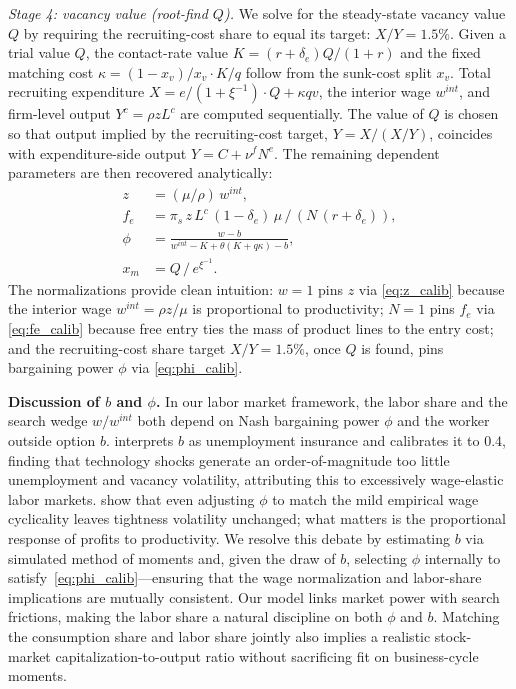 \documentclass[authoryear, review, 12pt]{elsarticle}
\begin{document}
	\medskip\noindent\textit{Stage 4: vacancy value (root-find $Q$).}
	We solve for the steady-state vacancy value $Q$ by requiring the recruiting-cost
	share to equal its target: $X/Y = 1.5\%$. Given a trial value $Q$, the
	contact-rate value $K=(r+\delta_e)Q/(1+r)$ and the fixed matching cost
	$\kappa=(1-x_v)/x_v \cdot K/q$ follow from the sunk-cost split $x_v$. Total
	recruiting expenditure $X=e/(1+\xi^{-1})\cdot Q+\kappa qv$, the interior
	wage $w^{int}$, and firm-level output $Y^c=\rho z L^c$ are computed
	sequentially. The value of $Q$ is chosen so that output implied by the
	recruiting-cost target, $Y=X/(X/Y)$, coincides with expenditure-side
	output $Y=C+\nu^f N^e$.
	The remaining dependent parameters are then recovered analytically:
	\begin{align}
		z      &= (\mu/\rho)\,w^{int}, \label{eq:z_calib}\\
		f_e    &= \pi_s\, z\, L^c\,(1-\delta_e)\,\mu\,/\,(N\,(r+\delta_e)), \label{eq:fe_calib}\\
		\phi   &= \frac{w-b}{w^{int}-K+\theta(K+q\kappa)-b}, \label{eq:phi_calib}\\
		x_m    &= Q\,/\,e^{\xi^{-1}}. \label{eq:xm_calib}
	\end{align}
	The normalizations provide clean intuition: $w=1$ pins $z$ via
	\eqref{eq:z_calib} because the interior wage $w^{int}=\rho z/\mu$ is
	proportional to productivity; $N=1$ pins $f_e$ via \eqref{eq:fe_calib}
	because free entry ties the mass of product lines to the entry cost; and the
	recruiting-cost share target $X/Y=1.5\%$, once $Q$ is found, pins bargaining
	power $\phi$ via \eqref{eq:phi_calib}.
	
	\medskip\noindent\textbf{Discussion of $b$ and $\phi$.}
	In our labor market framework, the labor share and the search wedge $w/w^{int}$
	both depend on Nash bargaining power $\phi$ and the worker outside option $b$.
	\citet{shimer_2005} interprets $b$ as unemployment insurance and calibrates it
	to $0.4$, finding that technology shocks generate an order-of-magnitude too
	little unemployment and vacancy volatility, attributing this to excessively
	wage-elastic labor markets. \citet{hagedorn_2008} show that even adjusting $\phi$
	to match the mild empirical wage cyclicality leaves tightness volatility
	unchanged; what matters is the proportional response of profits to productivity.
	We resolve this debate by estimating $b$ via simulated method of moments and, given the draw
	of $b$, selecting $\phi$ internally to satisfy~\eqref{eq:phi_calib}—ensuring
	that the wage normalization and labor-share implications are mutually consistent.
	Our model links market power with search frictions, making the labor share a
	natural discipline on both $\phi$ and $b$. Matching the consumption share and
	labor share jointly also implies a realistic stock-market capitalization-to-output
	ratio without sacrificing fit on business-cycle moments.
	
\end{document}

